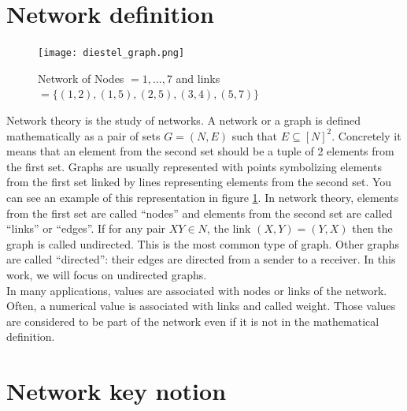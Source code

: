 \documentclass[a4paper, 12pt]{report}
\begin{document}
\section{Network definition}
\begin{figure}
\centering
\texttt{[image: diestel\_graph.png]}
\caption{Network of Nodes $= 1,...,7$ and links $= \{(1, 2), (1, 5), (2, 5), (3, 4), (5, 7)\}$ \citep{diestel}}
\label{diestel_graph}
\end{figure}

Network theory is the study of networks. A network or a graph is defined mathematically as a pair of sets $G = (N, E)$ such that $E \subseteq [N ]^2$. Concretely it means that an element from the second set should be a tuple of 2 elements from the first set.
Graphs are usually represented with points symbolizing elements from the first set linked by lines representing elements from the second set. You can see an example of this representation in figure \ref{diestel_graph}. In network theory, elements from the first set are called ``nodes'' and elements from the second set are called ``links'' or ``edges''. If for any pair $XY \in N$, the link $(X,Y) = (Y,X)$ then the graph is called undirected. This is the most common type of graph. Other graphs are called ``directed'': their edges are directed from a sender to a receiver. In this work, we will focus on undirected graphs. \citep{diestel}\\

In many applications, values are associated with nodes or links of the network. Often, a numerical value is associated with links and called weight. Those values are considered to be part of the network even if it is not in the mathematical definition.


\section{Network key notion}
\end{document}
